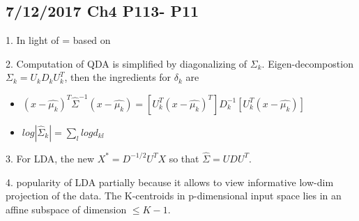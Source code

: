\documentclass[a4paper, 12pt]{article}
\begin{document}
\subsection*{7/12/2017 Ch4 P113- P11 }

1. In light of = based on

2. Computation of QDA is simplified by diagonalizing of $\Sigma_k$. Eigen-decompostion $\Sigma_k=U_kD_kU^T_k$, then the ingredients for $\delta_k$ are 
\begin{itemize}
	\item $(x-\hat{\mu_k})^T\hat{\Sigma}^{-1}(x-\hat{\mu_k})=[U^T_k(x-\hat{\mu_k})^T]D_k^{-1}[U^T_k(x-\hat{\mu_k})]$
	\item $log|\hat{\Sigma}_k|=\sum_{l}log d_{kl}$
\end{itemize}

3. For LDA, the new $X^*=D^{-1/2}U^TX$ so that $\hat{\Sigma}=UDU^T$.

4. popularity of LDA partially because it allows to view informative low-dim projection of the data. The K-centroids in p-dimensional input space lies in an affine subspace of dimension $\le K-1$.
\end{document}
